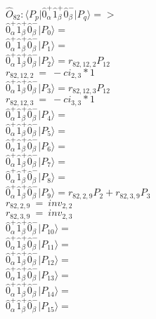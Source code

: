 \documentclass[14pt]{article}
\begin{document}
    $\hat{O}_{82}:  \langle{P_p}\vert \hat{0}_{\alpha}^{+}\hat{1}_{\beta}^{+}\hat{0}_{\beta}^{-} \vert{P_q}\rangle => $ \\ 
    $ \hat{0}_{\alpha}^{+}\hat{1}_{\beta}^{+}\hat{0}_{\beta}^{-} \vert{P_{0}}\rangle =  $ \\ 
    $ \hat{0}_{\alpha}^{+}\hat{1}_{\beta}^{+}\hat{0}_{\beta}^{-} \vert{P_{1}}\rangle =  $ \\ 
    $ \hat{0}_{\alpha}^{+}\hat{1}_{\beta}^{+}\hat{0}_{\beta}^{-} \vert{P_{2}}\rangle = {r}_{82,12,2}P_{12} $ \\ 
    ${r}_{82,12,2}\ =\ -{ci}_{2,3}*1 $ \\ 
    $ \hat{0}_{\alpha}^{+}\hat{1}_{\beta}^{+}\hat{0}_{\beta}^{-} \vert{P_{3}}\rangle = {r}_{82,12,3}P_{12} $ \\ 
    ${r}_{82,12,3}\ =\ -{ci}_{3,3}*1 $ \\ 
    $ \hat{0}_{\alpha}^{+}\hat{1}_{\beta}^{+}\hat{0}_{\beta}^{-} \vert{P_{4}}\rangle =  $ \\ 
    $ \hat{0}_{\alpha}^{+}\hat{1}_{\beta}^{+}\hat{0}_{\beta}^{-} \vert{P_{5}}\rangle =  $ \\ 
    $ \hat{0}_{\alpha}^{+}\hat{1}_{\beta}^{+}\hat{0}_{\beta}^{-} \vert{P_{6}}\rangle =  $ \\ 
    $ \hat{0}_{\alpha}^{+}\hat{1}_{\beta}^{+}\hat{0}_{\beta}^{-} \vert{P_{7}}\rangle =  $ \\ 
    $ \hat{0}_{\alpha}^{+}\hat{1}_{\beta}^{+}\hat{0}_{\beta}^{-} \vert{P_{8}}\rangle =  $ \\ 
    $ \hat{0}_{\alpha}^{+}\hat{1}_{\beta}^{+}\hat{0}_{\beta}^{-} \vert{P_{9}}\rangle = {r}_{82,2,9}P_{2}+{r}_{82,3,9}P_{3} $ \\ 
    ${r}_{82,2,9}\ =\ {inv}_{2,2} $ \\ 
    ${r}_{82,3,9}\ =\ {inv}_{2,3} $ \\ 
    $ \hat{0}_{\alpha}^{+}\hat{1}_{\beta}^{+}\hat{0}_{\beta}^{-} \vert{P_{10}}\rangle =  $ \\ 
    $ \hat{0}_{\alpha}^{+}\hat{1}_{\beta}^{+}\hat{0}_{\beta}^{-} \vert{P_{11}}\rangle =  $ \\ 
    $ \hat{0}_{\alpha}^{+}\hat{1}_{\beta}^{+}\hat{0}_{\beta}^{-} \vert{P_{12}}\rangle =  $ \\ 
    $ \hat{0}_{\alpha}^{+}\hat{1}_{\beta}^{+}\hat{0}_{\beta}^{-} \vert{P_{13}}\rangle =  $ \\ 
    $ \hat{0}_{\alpha}^{+}\hat{1}_{\beta}^{+}\hat{0}_{\beta}^{-} \vert{P_{14}}\rangle =  $ \\ 
    $ \hat{0}_{\alpha}^{+}\hat{1}_{\beta}^{+}\hat{0}_{\beta}^{-} \vert{P_{15}}\rangle =  $ \\ 
    
\end{document}
